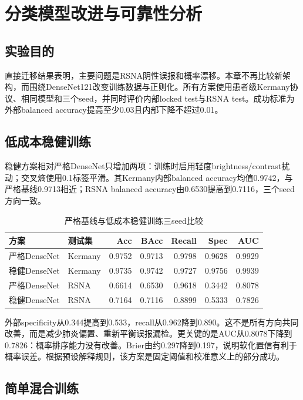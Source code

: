 \chapter{分类模型改进与可靠性分析}

\section{实验目的}

直接迁移结果表明，主要问题是RSNA阴性误报和概率漂移。本章不再比较新架构，而围绕DenseNet121改变训练数据与正则化。所有方案使用患者级Kermany协议、相同模型和三个seed，并同时评价内部locked test与RSNA test。成功标准为外部balanced accuracy提高至少0.03且内部下降不超过0.01。

\section{低成本稳健训练}

稳健方案相对严格DenseNet只增加两项：训练时启用轻度brightness/contrast扰动；交叉熵使用0.1标签平滑。其Kermany内部balanced accuracy均值0.9742，与严格基线0.9713相近；RSNA balanced accuracy由0.6530提高到0.7116，三个seed方向一致。

\begin{table}[H]
\centering
\caption{严格基线与低成本稳健训练三seed比较}
\begin{tabular}{llrrrrr}
\toprule 方案 & 测试集 & Acc & BAcc & Recall & Spec & AUC\\\midrule
严格DenseNet & Kermany & 0.9752 & 0.9713 & 0.9798 & 0.9628 & 0.9929\\
稳健DenseNet & Kermany & 0.9735 & 0.9742 & 0.9727 & 0.9756 & 0.9939\\
严格DenseNet & RSNA & 0.6614 & 0.6530 & 0.9618 & 0.3442 & 0.8078\\
稳健DenseNet & RSNA & 0.7164 & 0.7116 & 0.8899 & 0.5333 & 0.7826\\\bottomrule
\end{tabular}
\end{table}

外部specificity从0.344提高到0.533，recall从0.962降到0.890。这不是所有方向共同改善，而是减少肺炎偏置、重新平衡误报漏检。更关键的是AUC从0.8078下降到0.7826：概率排序能力没有改善。Brier由约0.297降到0.197，说明软化置信有利于概率误差。根据预设解释规则，该方案是固定阈值和校准意义上的部分成功。

\section{简单混合训练}

